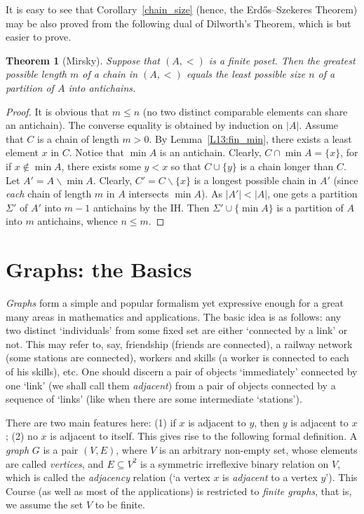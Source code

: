 \documentclass[12pt,notitlepage]{article}
\theoremstyle{plain}
\newtheorem{thm}{Theorem}[section]
\theoremstyle{definition}
\theoremstyle{plain}
\newcommand{\sbs}{\subseteq}
\renewcommand{\setminus}{\smallsetminus}
\newcommand{\1}{\mathbf{1}}
\newcommand{\0}{\mathbf{0}}
\newcommand{\mcomm}[1]{}
\begin{document}
It is easy to see that Corollary~\ref{chain_size} (hence, the Erd\H{o}s--Szekeres Theorem) may be also proved from the following dual of Dilworth's Theorem, which is but easier to prove.

\begin{thm}[Mirsky]
Suppose that $(A, <)$ is a finite poset. Then the greatest possible length $m$ of a chain in $(A, <)$ equals the least possible size $n$ of a partition of $A$ into antichains.
\end{thm}
\begin{proof}
It is obvious that $m \leq n$ (no two distinct comparable elements can share an antichain). The converse equality is obtained by induction on $|A|$. Assume that $C$ is a chain of length $m > 0$. By Lemma~\ref{L13:fin_min}, there exists a least element $x$ in $C$. Notice that $\min A$ is an antichain. Clearly, $C \cap \min A = \{ x \}$, for if $x \notin \min A$, there exists some $y < x$ so that $C \cup \{y\}$ is a chain longer than $C$. Let $A' = A \setminus \min A$. Clearly, $C' = C \setminus \{x\}$ is a longest possible chain in $A'$ (since \emph{each} chain of length $m$ in $A$ intersects $\min A$). As $|A'| < |A|$, one gets a partition $\Sigma'$ of $A'$ into $m - 1$ antichains by the IH. Then $\Sigma' \cup \{ \min A \}$ is a partition of $A$ into $m$ antichains, whence $n \leq m$.
\end{proof}

\section{Graphs: the Basics}
\mcomm{Our treatment of graphs is brief and mostly traditional. We try to employ the previously developed formalism as much as it is reasonably possible.}

\emph{Graphs} form a simple and popular formalism yet expressive enough for a great many areas in mathematics and applications. The basic idea is as follows: any two distinct `individuals' from some fixed set are either `connected by a link' or not. This may refer to, say, friendship (friends are connected), a railway network (some stations are connected), workers and skills (a worker is connected to each of his skills), etc. One should discern a pair of objects `immediately' connected by one `link' (we shall call them \emph{adjacent}) from a pair of objects connected by a sequence of `links' (like when there are some intermediate `stations'). 

There are two main features here: (1) if $x$ is adjacent to $y$, then $y$ is adjacent to $x$; (2) no $x$ is adjacent to itself. This gives rise to the following formal definition. A \emph{graph} $G$ is a pair $(V, E)$, where $V$ is an arbitrary non-empty set, whose elements are called \emph{vertices}, and $E \sbs V^2$ is a symmetric irreflexive binary relation on $V$, which is called the \emph{adjacency} relation (`a vertex $x$ is \emph{adjacent} to a vertex $y$'). This Course (as well as most of the applications) is restricted to \emph{finite graphs}, that is, we assume the set $V$ to be finite.
\end{document}
